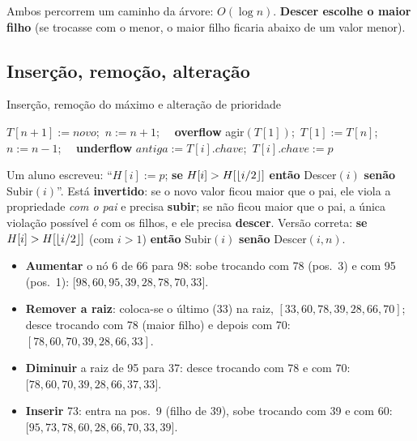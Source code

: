 \medskip
Ambos percorrem um caminho da árvore: $O(\log n)$. \textbf{Descer escolhe o maior filho} (se trocasse com o menor, o maior filho ficaria abaixo de um valor menor).

\subsection{Inserção, remoção, alteração}
\begin{pseudo}{Inserção, remoção do máximo e alteração de prioridade}
\begin{algorithmic}
 
   \State $T[n+1]:=novo$;\ $n:=n+1$;\ 
  \Else\ \textbf{overflow}
  \EndIf
\EndProcedure
{}
   \State agir$(T[1])$;\ $T[1]:=T[n]$;\ $n:=n-1$;\ 
  \Else\ \textbf{underflow}
  \EndIf
\EndProcedure
{}
  \State $antiga := T[i].chave$;\ $T[i].chave := p$
   \State {} 
  \Else \State {} 
  \EndIf
\EndProcedure
\end{algorithmic}
\end{pseudo}

\begin{cuidado}
Um aluno escreveu: ``$H[i]:=p$; \textbf{se} $H[i]>H[\lfloor i/2\rfloor]$ \textbf{então} Descer$(i)$ \textbf{senão} Subir$(i)$''. Está \textbf{invertido}: se o novo valor ficou maior que o pai, ele viola a propriedade \emph{com o pai} e precisa \textbf{subir}; se não ficou maior que o pai, a única violação possível é com os filhos, e ele precisa \textbf{descer}. Versão correta: \textbf{se} $H[i]>H[\lfloor i/2\rfloor]$ (com $i>1$) \textbf{então} Subir$(i)$ \textbf{senão} Descer$(i,n)$.
\end{cuidado}

\begin{exemplo}[{Traços conferidos -- heap $H=[95,60,78,39,28,66,70,33]$}]\leavevmode
\begin{itemize}
  \item \textbf{Aumentar} o nó 6 de 66 para 98: sobe trocando com 78 (pos.\ 3) e com 95 (pos.\ 1): $[98,60,95,39,$\allowbreak$28,78,70,33]$.
  \item \textbf{Remover a raiz}: coloca-se o último (33) na raiz, $[33,60,78,39,28,66,70]$; desce trocando com 78 (maior filho) e depois com 70: $[78,60,70,39,28,66,33]$.
  \item \textbf{Diminuir} a raiz de 95 para 37: desce trocando com 78 e com 70: $[78,60,70,39,$\allowbreak$28,66,37,33]$.
  \item \textbf{Inserir} 73: entra na pos.\ 9 (filho de 39), sobe trocando com 39 e com 60: $[95,73,78,60,$\allowbreak$28,66,70,33,39]$.
\end{itemize}
\end{exemplo}

